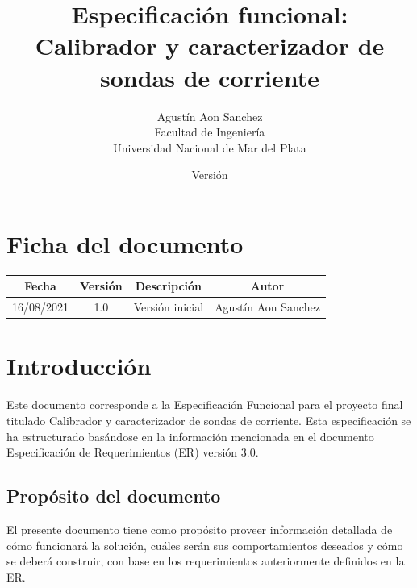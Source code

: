 \documentclass[titlepage, 12pt]{article}
\title{Especificación funcional:\\Calibrador y caracterizador de sondas de corriente}
\author{Agustín Aon Sanchez\\
Facultad de Ingeniería\\
Universidad Nacional de Mar del Plata}
\date{Versión \version}
\newcommand{\fecha}{16/08/2021} %
\newcommand{\version}{1.0}
\begin{document}
\maketitle



\section{Ficha del documento}
\begin{table}[!hbtp]
  \centering
  \begin{tabular}{|c|c|c|c|}
  \hline
  \rowcolor[HTML]{C0C0C0}
  Fecha  & Versión  & Descripción     & Autor               \\ \hline
  \fecha & \version & Versión inicial & Agustín Aon Sanchez \\ \hline
  \end{tabular}
\end{table}

\newpage
\tableofcontents
\newpage
\listoffigures
\newpage


\section{Introducción}
Este documento corresponde a la Especificación Funcional para el proyecto final titulado Calibrador y caracterizador de sondas de corriente. Esta especificación se ha estructurado basándose en la información mencionada en el documento Especificación de Requerimientos (ER) versión 3.0.

  \subsection{Propósito del documento}
  El presente documento tiene como propósito proveer información detallada de cómo funcionará la solución, cuáles serán sus comportamientos deseados y cómo se deberá construir, con base en los requerimientos anteriormente definidos en la ER.
\end{document}
